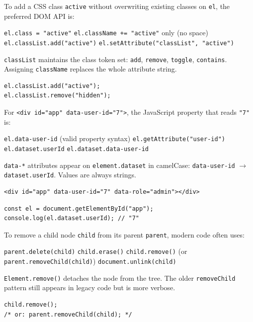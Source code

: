 \newpage
\question[4]
To add a CSS class \texttt{active} without overwriting existing classes on \texttt{el}, the preferred DOM API is:
\begin{choices}
  \choice \texttt{el.class = "active"}
  \choice \texttt{el.className += "active"} only (no space)
  \CorrectChoice \texttt{el.classList.add("active")}
  \choice \texttt{el.setAttribute("classList", "active")}
\end{choices}
\begin{solution}
  \texttt{classList} maintains the class token set: \texttt{add}, \texttt{remove}, \texttt{toggle}, \texttt{contains}. Assigning \texttt{className} replaces the whole attribute string.
\begin{lstlisting}[style=jsexam]
el.classList.add("active");
el.classList.remove("hidden");
\end{lstlisting}
\end{solution}

\question[4]
For \texttt{<div id="app" data-user-id="7">}, the JavaScript property that reads \texttt{"7"} is:
\begin{choices}
  \choice \texttt{el.data-user-id} (valid property syntax)
  \choice \texttt{el.getAttribute("user-id")}
  \CorrectChoice \texttt{el.dataset.userId}
  \choice \texttt{el.dataset.data-user-id}
\end{choices}
\begin{solution}
  \texttt{data-*} attributes appear on \texttt{element.dataset} in camelCase: \texttt{data-user-id} $\rightarrow$ \texttt{dataset.userId}. Values are always strings.
\begin{lstlisting}[style=htmlexam]
<div id="app" data-user-id="7" data-role="admin"></div>
\end{lstlisting}
\begin{lstlisting}[style=jsexam]
const el = document.getElementById("app");
console.log(el.dataset.userId); // "7"
\end{lstlisting}
\end{solution}

\question[4]
To remove a child node \texttt{child} from its parent \texttt{parent}, modern code often uses:
\begin{choices}
  \choice \texttt{parent.delete(child)}
  \choice \texttt{child.erase()}
  \CorrectChoice \texttt{child.remove()} (or \texttt{parent.removeChild(child)})
  \choice \texttt{document.unlink(child)}
\end{choices}
\begin{solution}
  \texttt{Element.remove()} detaches the node from the tree. The older \texttt{removeChild} pattern still appears in legacy code but is more verbose.
\begin{lstlisting}[style=jsexam]
child.remove();
/* or: parent.removeChild(child); */
\end{lstlisting}
\end{solution}

